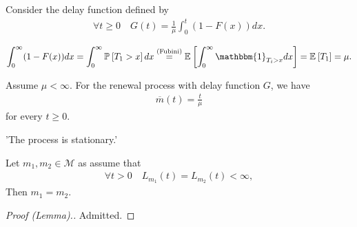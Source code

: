 \begin{defn}
	Consider the delay function defined by
	\begin{align}
		\forall t\geq 0 \quad G(t) = \frac{1}{\mu } \int_{0}^{t} (1-F(x))dx.
	\end{align}
\end{defn}
\begin{rmk}[]
	\begin{align}
		\int_{0}^{\infty} (1 - F(x)) dx = \int_{0}^{\infty} \mathbb{P}_{} \left[ T_1 > x \right] dx \stackrel{\textrm{(Fubini)}}{=} \mathbb{E}_{} \left[ \int_{0}^{\infty} \mathbbm{1}_{T_i > x} dx \right]  = \mathbb{E}_{} \left[ T_1 \right] = \mu .
	\end{align}
\end{rmk}

\begin{theorem}[]
	Assume $\mu <\infty$. For the renewal process with delay function $G$, we have
	\begin{align}
		\boxed{		\overline{m}(t) = \frac{t}{\mu }}
	\end{align}
	for every $t\geq 0$.
\end{theorem}
'The process is stationary.'
\begin{lemma}[]
	Let $m_1, m_2 \in \mathcal{M}$ as assume that
	\begin{align}
		\forall t>0 \quad L_{m_1}(t) = L_{m_2}(t) < \infty,
	\end{align}
Then $m_1 = m_2$.	
\end{lemma}
\begin{proof}[Proof (Lemma).]
	Admitted.
\end{proof}


